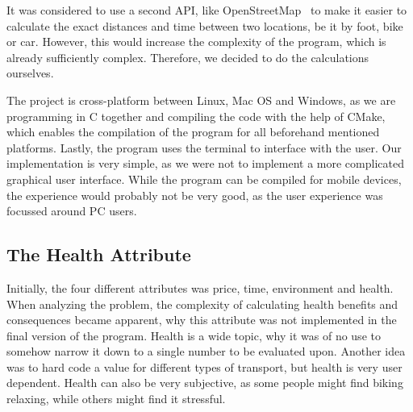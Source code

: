 It was considered to use a second API, like OpenStreetMap~\cite{openstreetmap} to make it easier to calculate the exact
distances and time between two locations, be it by foot, bike or car.
However, this would increase the complexity of the program, which is already sufficiently complex.
Therefore, we decided to do the calculations ourselves.

The project is cross-platform between Linux, Mac OS and Windows, as we are programming in C together and compiling the
code with the help of CMake, which enables the compilation of the program for all beforehand mentioned platforms.
Lastly, the program uses the terminal to interface with the user.
Our implementation is very simple, as we were not to implement a more complicated graphical user interface.
While the program can be compiled for mobile devices, the experience would probably not be very good, as the user
experience was focussed around PC users.

\subsection{The Health Attribute}\label{subsec:health-attribute}

Initially, the four different attributes was price, time, environment and health.
When analyzing the problem, the complexity of calculating health benefits and consequences became apparent,
why this attribute was not implemented in the final version of the program.
Health is a wide topic, why it was of no use to somehow narrow it down to a single number to be evaluated upon.
Another idea was to hard code a value for different types of transport, but health is very user dependent.
Health can also be very subjective, as some people might find biking relaxing, while others might find it stressful.
